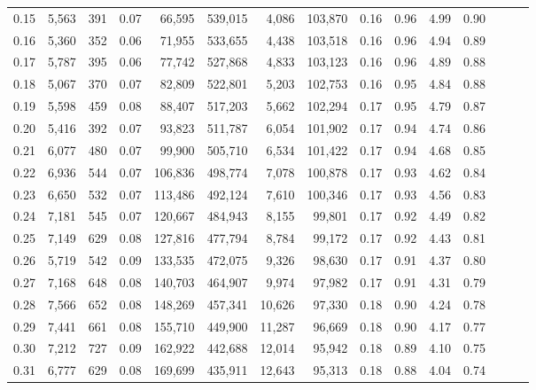\begin{tabular}{rrrrrrrrrrrrrrr}
0.15 &   5,563 &    391 &  0.07 &   66,595 &  539,015 &    4,086 &  103,870 &  0.16 &  0.96 &  4.99 &      0.90 \\
0.16 &   5,360 &    352 &  0.06 &   71,955 &  533,655 &    4,438 &  103,518 &  0.16 &  0.96 &  4.94 &      0.89 \\
0.17 &   5,787 &    395 &  0.06 &   77,742 &  527,868 &    4,833 &  103,123 &  0.16 &  0.96 &  4.89 &      0.88 \\
0.18 &   5,067 &    370 &  0.07 &   82,809 &  522,801 &    5,203 &  102,753 &  0.16 &  0.95 &  4.84 &      0.88 \\
0.19 &   5,598 &    459 &  0.08 &   88,407 &  517,203 &    5,662 &  102,294 &  0.17 &  0.95 &  4.79 &      0.87 \\
0.20 &   5,416 &    392 &  0.07 &   93,823 &  511,787 &    6,054 &  101,902 &  0.17 &  0.94 &  4.74 &      0.86 \\
0.21 &   6,077 &    480 &  0.07 &   99,900 &  505,710 &    6,534 &  101,422 &  0.17 &  0.94 &  4.68 &      0.85 \\
0.22 &   6,936 &    544 &  0.07 &  106,836 &  498,774 &    7,078 &  100,878 &  0.17 &  0.93 &  4.62 &      0.84 \\
0.23 &   6,650 &    532 &  0.07 &  113,486 &  492,124 &    7,610 &  100,346 &  0.17 &  0.93 &  4.56 &      0.83 \\
0.24 &   7,181 &    545 &  0.07 &  120,667 &  484,943 &    8,155 &   99,801 &  0.17 &  0.92 &  4.49 &      0.82 \\
0.25 &   7,149 &    629 &  0.08 &  127,816 &  477,794 &    8,784 &   99,172 &  0.17 &  0.92 &  4.43 &      0.81 \\
0.26 &   5,719 &    542 &  0.09 &  133,535 &  472,075 &    9,326 &   98,630 &  0.17 &  0.91 &  4.37 &      0.80 \\
0.27 &   7,168 &    648 &  0.08 &  140,703 &  464,907 &    9,974 &   97,982 &  0.17 &  0.91 &  4.31 &      0.79 \\
0.28 &   7,566 &    652 &  0.08 &  148,269 &  457,341 &   10,626 &   97,330 &  0.18 &  0.90 &  4.24 &      0.78 \\
0.29 &   7,441 &    661 &  0.08 &  155,710 &  449,900 &   11,287 &   96,669 &  0.18 &  0.90 &  4.17 &      0.77 \\
0.30 &   7,212 &    727 &  0.09 &  162,922 &  442,688 &   12,014 &   95,942 &  0.18 &  0.89 &  4.10 &      0.75 \\
0.31 &   6,777 &    629 &  0.08 &  169,699 &  435,911 &   12,643 &   95,313 &  0.18 &  0.88 &  4.04 &      0.74 \\

\end{tabular}
